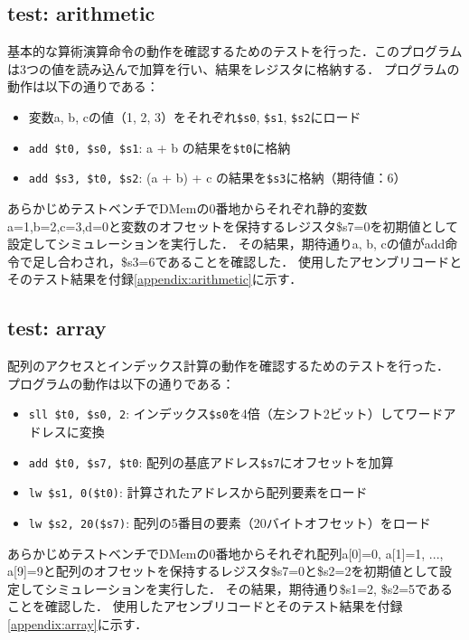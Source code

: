 \documentclass[dvipdfmx]{jsarticle}
\begin{document}
\subsection{test: arithmetic}
基本的な算術演算命令の動作を確認するためのテストを行った．このプログラムは3つの値を読み込んで加算を行い、結果をレジスタに格納する．
プログラムの動作は以下の通りである：
\begin{itemize}
\item 変数a, b, cの値（1, 2, 3）をそれぞれ\texttt{\$s0}, \texttt{\$s1}, \texttt{\$s2}にロード
\item \texttt{add \$t0, \$s0, \$s1}: a + b の結果を\texttt{\$t0}に格納
\item \texttt{add \$s3, \$t0, \$s2}: (a + b) + c の結果を\texttt{\$s3}に格納（期待値：6）
\end{itemize}
あらかじめテストベンチでDMemの0番地からそれぞれ静的変数a=1,b=2,c=3,d=0と変数のオフセットを保持するレジスタ\$s7=0を初期値として設定してシミュレーションを実行した．
その結果，期待通りa, b, cの値がadd命令で足し合わされ，\$s3=6であることを確認した．
使用したアセンブリコードとそのテスト結果を付録\ref{appendix:arithmetic}に示す．

\subsection{test: array}
配列のアクセスとインデックス計算の動作を確認するためのテストを行った．
プログラムの動作は以下の通りである：
\begin{itemize}
\item \texttt{sll \$t0, \$s0, 2}: インデックス\texttt{\$s0}を4倍（左シフト2ビット）してワードアドレスに変換
\item \texttt{add \$t0, \$s7, \$t0}: 配列の基底アドレス\texttt{\$s7}にオフセットを加算
\item \texttt{lw \$s1, 0(\$t0)}: 計算されたアドレスから配列要素をロード
\item \texttt{lw \$s2, 20(\$s7)}: 配列の5番目の要素（20バイトオフセット）をロード
\end{itemize}
あらかじめテストベンチでDMemの0番地からそれぞれ配列a[0]=0, a[1]=1, ..., a[9]=9と配列のオフセットを保持するレジスタ\$s7=0と\$s2=2を初期値として設定してシミュレーションを実行した．
その結果，期待通り\$s1=2, \$s2=5であることを確認した．
使用したアセンブリコードとそのテスト結果を付録\ref{appendix:array}に示す．
\end{document}
